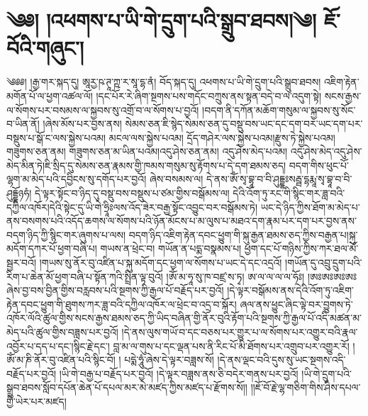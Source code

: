 \chapter{༄༅། །འཕགས་པ་ཡི་གེ་དྲུག་པའི་སྒྲུབ་ཐབས།༄། ཇོ་བོའི་གཞུང་། }༄༅༅། །རྒྱ་གར་སྐད་དུ། ཨཱརྱ་ཥ་ཊཱ་ཀྵ་ར་སཱ་དྷ་ནཾ། བོད་སྐད་དུ། འཕགས་པ་ཡི་གེ་དྲུག་པའི་སྒྲུབ་ཐབས། འཇིག་རྟེན་མགོན་པོ་ལ་ཕྱག་འཚལ་ལོ། །དང་པོར་རེ་ཞིག་སྔགས་པས་གདོང་བཀྲུས་ནས་སྟན་བདེ་བ་ལ་འདུག་སྟེ། སངས་རྒྱས་ལ་སོགས་པར་བསམས་ལ་སྐྱབས་སུ་འགྲོ་བ་ལ་སོགས་པ་བྱའོ། །བདག་ནི་དཀོན་མཆོག་གསུམ་ལ་སྐྱབས་སུ་སོང་བ་ཡིན་ནོ། །ཞེས་མོས་པར་བྱས་ནས། སེམས་ཅན་ཇི་སྙེད་སེམས་ཅན་དུ་བསྡུ་བས་ཡང་དང་དག་བར་ཡང་དག་པར་བསྡུས་པ་སྒོ་ང་ལས་སྐྱེས་པའམ། མངལ་ལས་སྐྱེས་པའམ། དྲོད་གཤེར་ལས་སྐྱེས་པའམ།རྫུས་ཏེ་སྐྱེས་པའམ། གཟུགས་ཅན་ནམ། གཟུགས་ཅན་མ་ཡིན་པའམ།འདུ་ཤེས་ཅན་ནམ། འདུ་ཤེས་མེད་པའམ། འདུ་ཤེས་མེད་འདུ་ཤེས་མེད་མིན་ཏེ།ཇི་སྲིད་དུ་སེམས་ཅན་རྣམས་གྱི་ཁམས་གསུམ་སུ་རྟོགས་པ་དེ་དག་ཐམས་ཅད། བདག་གིས་ཕུང་པོ་ལྷག་མ་མེད་པའི་དབྱིངས་སུ་དགོད་པར་བྱའོ། ཞེས་བསམས་ལ། དེ་ནས་ཨོཾ་སྭ་བྷཱ་བ་བི་ཤུདྡྷཿསརྦྦ་དྷརྨཱ་སྭ་བྷཱ་བ་བི་ཤུདྡྷོཉཧཾ། དེ་ལྟར་སྟོང་བ་ཉིད་དུ་བསྡུ་བས་བསྡུས་པ་ཙམ་གྱིས་བསྒོམས་ལ། དེའི་འོག་ཏུ་རང་གི་སྙིང་གར་ཟླ་བའི་དཀྱིལ་འཁོར།དེའི་སྟེང་དུ་ཡི་གེ་ཧྲཱིཿལས་འོད་ཟེར་བརྒྱ་སྟོང་འབྱུང་བར་བསྒོམས་ཏེ། ཡང་དེ་ཉིད་ཀྱིས་ཐོག་མ་མེད་པ་ནས་བསགས་པའི་འདོད་ཆགས་ལ་སོགས་པའི་ཉོན་མོངས་པ་མ་ལུས་པ་མཐའ་དག་རྣམ་པར་དག་པར་བྱས་ནས་བདག་ཉིད་ཀྱི་སྙིང་གར་ཞུགས་པ་ལས། བདག་ཉིད་འཇིག་རྟེན་དབང་ཕྱུག་གི་སྐུ་རྒྱན་ཐམས་ཅད་ཀྱིས་བརྒྱན་པ།སྐུ་མདོག་དཀར་པོ་ཕྱག་བཞི་པ། གཡས་ན་ཕྲེང་བ། གཡོན་ན་པདྨ་བསྣམས་པ། ཕྱག་དང་པོ་གཉིས་ཀྱིས་ཀར་ཐལ་མོ་སྦྱར་བའོ། །གཡས་སུ་ནོར་བུ་འཛིན་པ་སྐུ་མདོག་དང་ཕྱག་ལ་སོགས་པ་ཡང་དེ་དང་འདྲའོ། །གཡོན་དུ་འབྲུ་དྲུག་པའི་རིག་པ་ཆེན་མོ་ཕྱག་བཞི་པ་སྟོན་ཀའི་སྤྲིན་ལྟ་བུའོ། །ཨོཾ་མ་ཧཱ་སུ་ཁ་བཛྲ་ས་ཏྭ། ཨ་ལ་ལ་ལ་ལ་ཧོཿ། །ཨཿཨཿཨཿཨཿཞེས་བྱ་བས་བྱིན་གྱིས་བརླབས་པའི་སྔགས་ཀྱི་རྒྱལ་པོ་བརྗོད་པར་བྱའོ། །དེ་ལྟར་བསྒོམས་ནས་དེའི་འོག་ཏུ་འཇིག་རྟེན་དབང་ཕྱུག་གི་ཐུགས་ཀར་ཟླ་བའི་དཀྱིལ་འཁོར་ལ་ཕྲེང་བ་འདྲ་བ་སྐོར། ཞལ་ནས་ཕྱུང་ཞིང་ལྟེ་བར་བྱུགས་ཏེ་འཁོར་ལོའི་ཚུལ་གྱིས་སངས་རྒྱས་ཐམས་ཅད་ཀྱི་ཡིད་བཞིན་གྱི་ནོར་བུའི་རྟོག་པའི་སྔགས་ཀྱི་རྒྱལ་པོ་འདི་མཚན་མ་མེད་པའི་ཚུལ་གྱིས་བཟླས་པར་བྱའོ། །དེ་ནས་ལུས་གཡོ་བ་དང་བཅས་པར་གྱུར་པ་ལ་སོགས་པར་འགྱུར་བའི་རྣལ་འབྱོར་པ་དད་པ་དང་།སྙིང་རྗེ་དང་། བླ་མ་ལ་གུས་པ་དང་ལྡན་པས་ནི་རིང་པོ་མི་ཐོགས་པར་འགྲུབ་པར་འགྱུར་རོ། །ཨོཾ་མ་ཎི་ནོར་བུ་འཛིན་པའི་སྙིང་བོ། ། པདྨེ་ཧཱུཾ་ཞེས་དེ་ལྟར་བཟླས་སོ། །དེ་ནས་ལྡང་བའི་དུས་སུ་ཡང་སྔགས་འདི་བརྗོད་པར་བྱའོ། །ཡི་གེ་བརྒྱ་པ་བརྗོད་པར་བྱའོ། །དེ་ལྟར་བཟླས་ནས་ཅི་བདེར་གནས་པར་བྱའོ། །ཡི་གེ་དྲུག་པའི་སྒྲུབ་ཐབས་སློབ་དཔོན་ཆེན་པོ་དཔལ་མར་མེ་མཛད་ཀྱིས་མཛད་པ་རྫོགས་སོ།། །།ཇོ་བོ་རྗེ་ལྷ་གཅིག་གིས་ཤིས་དཔལ་གྱི་ཡེར་པར་མཛད། 